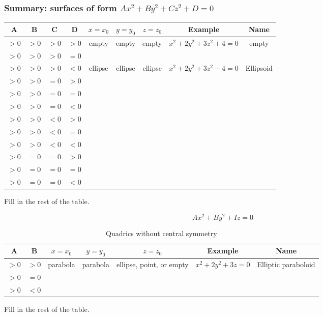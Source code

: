 \begin{frame}
\frametitle{Summary: surfaces of form $Ax^2+By^2+Cz^2+D=0$}
\tiny
\begin{tabular}{|c|c|c|c|c|c|c|c|c|}
\hline
A & B & C & D & $x=x_0$ & $y=y_0$ & $z=z_0$ & Example & Name
\\\hline
$>0$ & $>0$ & $>0$ & $>0$ & empty & empty & empty & $x^2+2y^2+3z^2+4=0$ & empty \\
\hline
$>0$ & $>0$ & $>0$ & $=0$ &  &  &  &  &  \\
\hline
$>0$ & $>0$ & $>0$ & $<0$ & ellipse & ellipse & ellipse & $x^2+2y^2+3z^2-4=0$ & Ellipsoid \\
\hline
$>0$ & $>0$ & $=0$ & $>0$ &  &  &  &  &  \\
\hline
$>0$ & $>0$ & $=0$ & $=0$ &  &  &  &  &  \\
\hline
$>0$ & $>0$ & $=0$ & $<0$ &  &  &  &  &  \\
\hline
$>0$ & $>0$ & $<0$ & $>0$ &  &  &  &  &  \\
\hline
$>0$ & $>0$ & $<0$ & $=0$ &  &  &  &  &  \\
\hline
$>0$ & $>0$ & $<0$ & $<0$ &  &  &  &  &  \\
\hline
$>0$ & $=0$ & $=0$ & $>0$ &  &  &  &  &  \\
\hline
$>0$ & $=0$ & $=0$ & $=0$ &  &  &  &  &  \\
\hline
$>0$ & $=0$ & $=0$ & $<0$ &  &  &  &  &  \\
\hline
\end{tabular}

Fill in the rest of the table.
\end{frame}

\begin{frame}
\begin{equation*}
Ax^2+By^2+Iz=0
\end{equation*}

\begin{table}
\begin{tabular}{|c|c|c|c|c|c|c|}
  \hline
  A & B  & $x=x_0$ & $y=y_0$ & $z=z_0$ & Example & Name
  \\
  \hline
  $>0$ & $>0$   & parabola & parabola & ellipse, point, or empty & $x^2+2y^2+3z=0$ & Elliptic paraboloid \\
  \hline
  $>0$ & $=0$ & &  &  &  &   \\
  \hline
  $>0$ & $<0$ &  &  &  &  &   \\
  \hline
\end{tabular}
  \caption{Quadrics without central symmetry}
\end{table}
\bigskip

Fill in the rest of the table.
\end{frame}